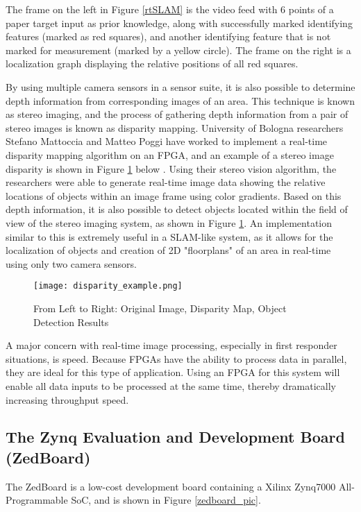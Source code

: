 The frame on the left in Figure \ref{rtSLAM} is the video feed with 6 points of a paper target input as prior knowledge, along with successfully marked identifying features (marked as red squares), and another identifying feature that is not marked for measurement (marked by a yellow circle). The frame on the right is a localization graph displaying the relative positions of all red squares.
\par
By using multiple camera sensors in a sensor suite, it is also possible to determine depth information from corresponding images of an area. This technique is known as stereo imaging, and the process of gathering depth information from a pair of stereo images is known as disparity mapping. University of Bologna researchers Stefano Mattoccia and Matteo Poggi have worked to implement a real-time disparity mapping algorithm on an FPGA, and an example of a stereo image disparity is shown in Figure \ref{disparity_example} below \cite{mattoccia}. Using their stereo vision algorithm, the researchers were able to generate real-time image data showing the relative locations of objects within an image frame using color gradients. Based on this depth information, it is also possible to detect objects located within the field of view of the stereo imaging system, as shown in Figure \ref{disparity_example}. An implementation similar to this is extremely useful in a SLAM-like system, as it allows for the localization of objects and creation of 2D "floorplans" of an area in real-time using only two camera sensors.
\par
\begin{figure}[H]
	\centerline{\texttt{[image: disparity\_example.png]}}
	\caption{From Left to Right: Original Image, Disparity Map, Object Detection Results \cite{mattoccia}}
	\label{disparity_example}
\end{figure}
\par
A major concern with real-time image processing, especially in first responder situations, is speed. Because FPGAs have the ability to process data in parallel, they are ideal for this type of application. Using an FPGA for this system will enable all data inputs to be processed at the same time, thereby dramatically increasing throughput speed. 

\subsection{The Zynq Evaluation and Development Board (ZedBoard)}
The ZedBoard is a low-cost development board containing a Xilinx Zynq7000 All-Programmable SoC, and is shown in Figure \ref{zedboard_pic}.

